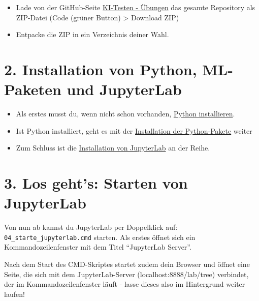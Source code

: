 \documentclass[
  letterpaper,
  DIV=11,
  numbers=noendperiod,
  oneside]{scrreprt}
\providecommand{\tightlist}{%
  \setlength{\itemsep}{0pt}\setlength{\parskip}{0pt}}
\begin{document}
\begin{tcolorbox}

\begin{itemize}
\tightlist
\item
  Lade von der GitHub-Seite
  \href{https://github.com/KI-Testen/Uebungen}{KI-Testen - Übungen} das
  gesamte Repository als ZIP-Datei (Code (grüner Button) \textgreater{}
  Download ZIP)
\item
  Entpacke die ZIP in ein Verzeichnis deiner Wahl.
\end{itemize}

\section*{2. Installation von Python, ML-Paketen und
JupyterLab}\label{installation-von-python-ml-paketen-und-jupyterlab}


\begin{itemize}
\tightlist
\item
  Als erstes musst du, wenn nicht schon vorhanden,
  \href{Einstieg_Vorbereitung/Installation_Python.md}{Python
  installieren}.
\item
  Ist Python installiert, geht es mit der
  \href{Einstieg_Vorbereitung/Installation_Pakete.md}{Installation der
  Python-Pakete} weiter
\item
  Zum Schluss ist die
  \href{Einstieg_Vorbereitung/Installation_JupyterLab.md}{Installation
  von JupyterLab} an der Reihe.
\end{itemize}

\section*{3. Los geht's: Starten von
JupyterLab}\label{los-gehts-starten-von-jupyterlab}


Von nun ab kannst du JupyterLab per Doppelklick auf:
\texttt{04\_starte\_jupyterlab.cmd} starten. Als erstes öffnet sich ein
Kommandozeilenfenster mit dem Titel ``JupyterLab Server''.

Nach dem Start des CMD-Skriptes startet zudem dein Browser und öffnet
eine Seite, die sich mit dem JupyterLab-Server (localhost:8888/lab/tree)
verbindet, der im Kommandozeilenfenster läuft - lasse dieses also im
Hintergrund weiter laufen!


\end{tcolorbox}
\end{document}
